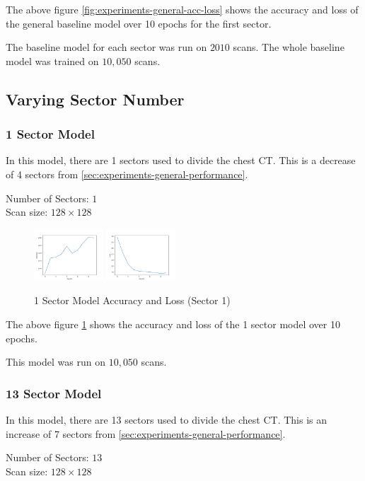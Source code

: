 \documentclass[10pt,twocolumn,letterpaper]{article}
\begin{document}
      The above figure \ref{fig:experiments-general-acc-loss} shows the accuracy and loss of the general baseline model over 10 epochs for the first sector.
    
      The baseline model for each sector was run on $2010$ scans. The whole baseline model was trained on $10,050$ scans.
   \subsection{Varying Sector Number} \label{sec:experiments-sector}
      \subsubsection{1 Sector Model} \label{sec:experiments-sector-13}
         In this model, there are 1 sectors used to divide the chest CT. This is a decrease of 4 sectors from \ref{sec:experiments-general-performance}.
         \begin{center}
            Number of Sectors: $1$ \\
            Scan size: $128 \times 128$
         \end{center}

         \begin{figure}[h]
            \centering
            \includegraphics[width=0.23\textwidth]{./images/training_accuracy_13_sector_128_px.png}
            \includegraphics[width=0.23\textwidth]{./images/training_loss_13_sector_128_px.png}
            \caption{1 Sector Model Accuracy and Loss (Sector 1)}
            \label{fig:experiments-1-sector-acc-loss}
         \end{figure}
    
         The above figure \ref{fig:experiments-1-sector-acc-loss} shows the accuracy and loss of the 1 sector model over 10 epochs.
    
         This model was run on $10,050$ scans.
    
      \subsubsection{13 Sector Model} \label{sec:experiments-sector-13}
         In this model, there are 13 sectors used to divide the chest CT. This is an increase of 7 sectors from \ref{sec:experiments-general-performance}.
         \begin{center}
            Number of Sectors: $13$ \\
            Scan size: $128 \times 128$
         \end{center}
    
\end{document}
